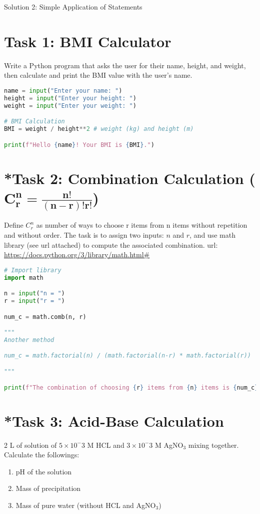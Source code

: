 \documentclass[11pt]{article}
\begin{document}
\begin{center}
    \Large{Solution 2: Simple Application of Statements}
\end{center}

\section*{Task 1: BMI Calculator}
Write a Python program that asks the user for their name, height, and weight, then calculate and print the BMI value with the user's name.

\begin{lstlisting}[language=Python]
name = input("Enter your name: ")
height = input("Enter your height: ")
weight = input("Enter your weight: ")

# BMI Calculation
BMI = weight / height**2 # weight (kg) and height (m)

print(f"Hello {name}! Your BMI is {BMI}.")
\end{lstlisting}

\section*{*Task 2: Combination Calculation (\(\mathbf{C_r^n = \frac{n!}{(n-r)!r!}}\))}
Define \(C_r^n\) as number of ways to choose r items from n items without repetition and without order.
The task is to assign two inputs: \(n\) and \(r\), and use math library (see url attached) to compute the associated combination.
url: \url{https://docs.python.org/3/library/math.html#}

\begin{lstlisting}[language=Python]
# Import library 
import math

n = input("n = ")
r = input("r = ")

num_c = math.comb(n, r)

"""
Another method

num_c = math.factorial(n) / (math.factorial(n-r) * math.factorial(r))

"""

print(f"The combination of choosing {r} items from {n} items is {num_c}")
\end{lstlisting}

\newpage

\section*{*Task 3: Acid-Base Calculation}
2 L of solution of \(5 \times 10^-3\) M HCL and \(3 \times 10^-3\) M AgNO\(_3\) mixing together. Calculate the followings:
\begin{enumerate}
    \item pH of the solution
    \item Mass of precipitation
    \item Mass of pure water (without HCL and AgNO\(_3\)) 
\end{enumerate}
\end{document}
